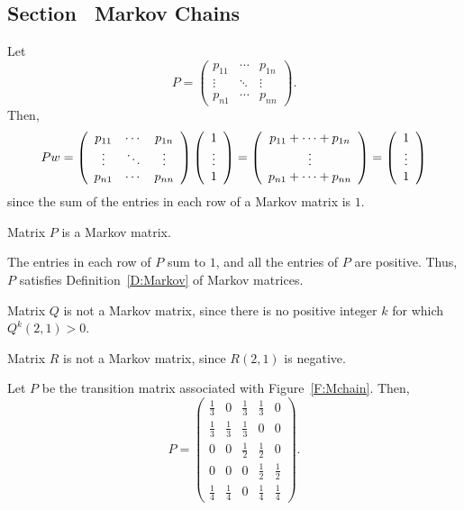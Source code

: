 \subsection*{Section~\protect{\ref{S:TransitionApplied}} Markov Chains}

Let
\[ P = \left(\begin{array}{ccc} p_{11} & \cdots & p_{1n} \\
\vdots & \ddots & \vdots \\ p_{n1} & \cdots & p_{nn}
\end{array}\right). \]
Then,
\[ Pw = \left(\begin{array}{ccc} p_{11} & \cdots & p_{1n} \\
\vdots & \ddots & \vdots \\ p_{n1} & \cdots & p_{nn}
\end{array}\right) \left(\begin{array}{c} 1 \\ \vdots \\ 1\end{array}\right) = 
\left(\begin{array}{c} p_{11} + \cdots + p_{1n} \\ \vdots \\ p_{n1} + \cdots +
p_{nn}\end{array}\right) = \left(\begin{array}{c} 1 \\ \vdots \\ 1\end{array}\right) \]
since the sum of the entries in each row of a Markov matrix is $1$.

 \ans Matrix $P$ is a Markov matrix.

\soln The entries in each row of $P$ sum to $1$, and all the entries of
$P$ are positive.  Thus, $P$ satisfies Definition~\ref{D:Markov} of Markov
matrices.

 Matrix $Q$ is not a Markov matrix, since there is no
positive integer $k$ for which $Q^k(2,1) > 0$.

 Matrix $R$ is not a Markov matrix, since $R(2,1)$ is
negative.

Let $P$ be the transition matrix associated with Figure~\ref{F:Mchain}.
Then,
\[ P = \left(\begin{array}{rrrrr}
\frac{1}{3} & 0 & \frac{1}{3} & \frac{1}{3} & 0 \\
\frac{1}{3} & \frac{1}{3} & \frac{1}{3} & 0 & 0 \\
0 & 0 & \frac{1}{2} & \frac{1}{2} & 0 \\
0 & 0 & 0 & \frac{1}{2} & \frac{1}{2} \\
\frac{1}{4} & \frac{1}{4} & 0 & \frac{1}{4} & \frac{1}{4}
\end{array}\right). \]

